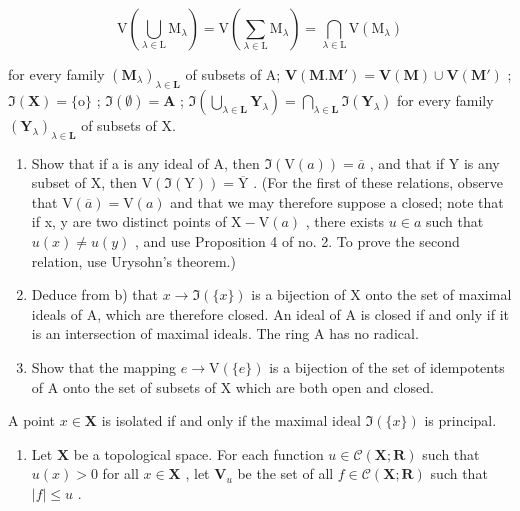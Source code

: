 \[
\mathrm{V} \left(\bigcup_ {\lambda \in \mathrm{L}} \mathrm{M} _ {\lambda}\right) = \mathrm{V} \left(\sum_ {\lambda \in \mathrm{L}} \mathrm{M} _ {\lambda}\right) = \bigcap_ {\lambda \in \mathrm{L}} \mathrm{V} (\mathrm{M} _ {\lambda})
\]

for every family \((\mathbf{M}_{\lambda})_{\lambda \in \mathbf{L}}\) of subsets of A; \(\mathbf{V}(\mathbf{M}. \mathbf{M}') = \mathbf{V}(\mathbf{M}) \cup \mathbf{V}(\mathbf{M}')\) ; \(\Im(\mathbf{X}) = \{\mathrm{o}\}\) ; \(\Im(\emptyset) = \mathbf{A}\) ; \(\Im\left(\bigcup_{\lambda \in \mathbf{L}} \mathbf{Y}_{\lambda}\right) = \bigcap_{\lambda \in \mathbf{L}} \Im(\mathbf{Y}_{\lambda})\) for every family \((\mathbf{Y}_{\lambda})_{\lambda \in \mathbf{L}}\) of subsets of X.

\begin{enumerate}
\def\labelenumi{\alph{enumi})}
\setcounter{enumi}{1}
\item
  Show that if a is any ideal of A, then \(\Im(\mathrm{V}(a)) = \overline{a}\) , and that if Y is any subset of X, then \(\mathrm{V}(\Im(\mathrm{Y})) = \overline{\mathrm{Y}}\) . (For the first of these relations, observe that \(\mathrm{V}(\overline{a}) = \mathrm{V}(a)\) and that we may therefore suppose a closed; note that if x, y are two distinct points of \(\mathrm{X} - \mathrm{V}(a)\) , there exists \(u \in a\) such that \(u(x) \neq u(y)\) , and use Proposition 4 of no. 2. To prove the second relation, use Urysohn's theorem.)
\item
  Deduce from b) that \(x \to \Im(\{x\})\) is a bijection of X onto the set of maximal ideals of A, which are therefore closed. An ideal of A is closed if and only if it is an intersection of maximal ideals. The ring A has no radical.
\item
  Show that the mapping \(e \to \mathrm{V}(\{e\})\) is a bijection of the set of idempotents of A onto the set of subsets of X which are both open and closed.
\end{enumerate}

A point \(x \in \mathbf{X}\) is isolated if and only if the maximal ideal \(\Im(\{x\})\) is principal.

\begin{enumerate}
\def\labelenumi{\arabic{enumi})}
\setcounter{enumi}{13}
\tightlist
\item
  Let \(\mathbf{X}\) be a topological space. For each function \(u \in \mathcal{C}(\mathbf{X}; \mathbf{R})\) such that \(u(x) > 0\) for all \(x \in \mathbf{X}\) , let \(\mathbf{V}_u\) be the set of all \(f \in \mathcal{C}(\mathbf{X}; \mathbf{R})\) such that \(|f| \leqslant u\) .
\end{enumerate}

